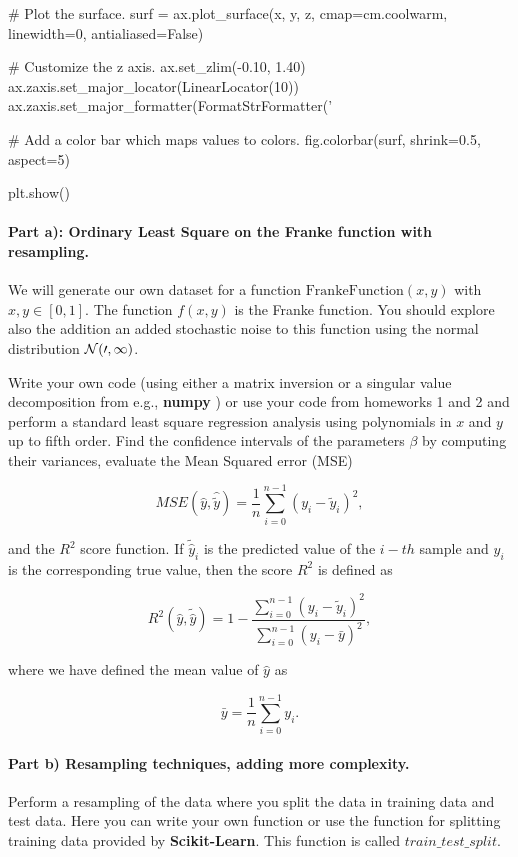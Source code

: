 \documentclass[%
oneside,                 %
final,                   %
10pt]{article}
\begin{document}
# Plot the surface.
surf = ax.plot_surface(x, y, z, cmap=cm.coolwarm,
                       linewidth=0, antialiased=False)

# Customize the z axis.
ax.set_zlim(-0.10, 1.40)
ax.zaxis.set_major_locator(LinearLocator(10))
ax.zaxis.set_major_formatter(FormatStrFormatter('%

# Add a color bar which maps values to colors.
fig.colorbar(surf, shrink=0.5, aspect=5)

plt.show()

\epycod


\paragraph{Part a): Ordinary Least Square on the Franke function  with resampling.}
We will generate our own dataset for a function
$\mathrm{FrankeFunction}(x,y)$ with $x,y \in [0,1]$. The function
$f(x,y)$ is the Franke function. You should explore also the addition
an added stochastic noise to this function using the normal
distribution $\cal{N}(0,1)$.

Write your own code (using either a matrix inversion or a singular
value decomposition from e.g., \textbf{numpy} ) or use your code from
homeworks 1 and 2 and perform a standard least square regression
analysis using polynomials in $x$ and $y$ up to fifth order. Find the
confidence intervals of the parameters $\beta$ by computing their
variances, evaluate the Mean Squared error (MSE)

\[ MSE(\hat{y},\hat{\tilde{y}}) = \frac{1}{n}
\sum_{i=0}^{n-1}(y_i-\tilde{y}_i)^2, 
\] 

and the $R^2$ score function.  If $\tilde{\hat{y}}_i$ is the predicted
value of the $i-th$ sample and $y_i$ is the corresponding true value,
then the score $R^2$ is defined as

\[
R^2(\hat{y}, \tilde{\hat{y}}) = 1 - \frac{\sum_{i=0}^{n - 1} (y_i - \tilde{y}_i)^2}{\sum_{i=0}^{n - 1} (y_i - \bar{y})^2},
\]

where we have defined the mean value  of $\hat{y}$ as

\[
\bar{y} =  \frac{1}{n} \sum_{i=0}^{n - 1} y_i.
\]

\paragraph{Part b) Resampling techniques, adding more complexity.}
Perform a resampling of the data where you split the data in training
data and test data. Here you can write your own function or use the
function for splitting training data provided by \textbf{Scikit-Learn}.
This function is called $train\_test\_split$.
\end{document}

